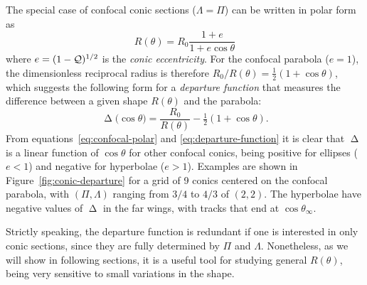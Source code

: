 \documentclass[useAMS, usenatbib, a4paper]{mnras}
\DeclareMathOperator{\Depart}{\Delta}
\newcommand\ecc{\ensuremath{e}}
\begin{document}
The special case of confocal conic sections
(\(\Lambda = \Pi\)) can be written in polar form as
\begin{equation}
  \label{eq:confocal-polar}
  R(\theta) = R_0 \frac {1 + \ecc} {1 + \ecc \cos \theta}
\end{equation}
where \(\ecc = (1 - \Q)^{1/2}\) is the \textit{conic eccentricity}.
For the confocal parabola (\(\ecc = 1\)), the dimensionless reciprocal
radius is therefore \(R_0/R(\theta) = \tfrac12 (1 + \cos \theta)\), which
suggests the following form for a \textit{departure function} that
measures the difference between a given shape \(R(\theta)\) and the
parabola:
\begin{equation}
  \label{eq:departure-function}
  \Depart\bigl(\cos \theta\bigr) = \frac{R_0} {R(\theta)} - \tfrac12 \left( 1 + \cos \theta \right). 
\end{equation}
From equations~\eqref{eq:confocal-polar} and
\eqref{eq:departure-function} it is clear that \(\Depart\) is a linear
function of \(\cos \theta\) for other confocal conics, being positive for
ellipses (\(\ecc < 1\)) and negative for hyperbolae (\(\ecc > 1\)).
Examples are shown in Figure~\ref{fig:conic-departure} for a grid of 9
conics centered on the confocal parabola, with \((\Pi, \Lambda)\) ranging from
\(3/4\) to \(4/3\) of \((2, 2)\).  The hyperbolae have negative values
of \(\Depart\) in the far wings, with tracks that end at \(\cos \theta_\infty\).

Strictly speaking, the departure function is redundant if one is
interested in only conic sections, since they are fully determined by
\(\Pi\) and \(\Lambda\).  Nonetheless, as we will show in following sections,
it is a useful tool for studying general \(R(\theta)\), being very
sensitive to small variations in the shape.


\end{document}
